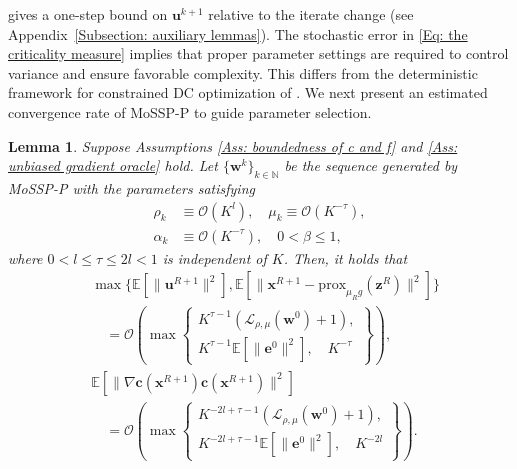 \documentclass{article}
\theoremstyle{plain}
\newtheorem{lemma}{Lemma}[section]
\theoremstyle{definition}
\theoremstyle{remark}
\newcommand{\EE}{\mathbb{E}}
\newcommand{\NN}{\mathbb{N}}
\newcommand{\prox}{\mathrm{prox}}
\newcommand{\bx}{\bm{x}}
\newcommand{\bc}{\bm{c}}
\newcommand{\be}{\bm{e}}
\newcommand{\bu}{\bm{u}}
\newcommand{\bz}{\bm{z}}
\newcommand{\calL}{\mathcal{L}}
\newcommand{\calO}{\mathcal{O}}
\newcommand{\bw}{\bm{w}}
\numberwithin{equation}{section}
\begin{document}
 gives a one-step bound on $\bu^{k+1}$ relative to the iterate change (see Appendix~\ref{Subsection: auxiliary lemmas}). The stochastic error in \eqref{Eq: the criticality measure} implies that proper parameter settings are required to control variance and ensure favorable complexity. This differs from the deterministic framework for constrained DC optimization of \citet{sun2023algorithms}. We next present an estimated convergence rate of MoSSP-P to guide parameter selection.
\begin{lemma}
    \label{Lemma: the estimation of the convergence rate of Polyak for infeasible stationary point} 
    Suppose Assumptions \ref{Ass: boundedness of c and f} and \ref{Ass: unbiased gradient oracle} hold. Let $\{\bw^{k}\}_{k \in \NN}$ be the sequence generated by MoSSP-P
    with the parameters satisfying
\begin{equation}
    \label{Eq: the parameter conditions for Polyak in main body}
\begin{aligned}
\rho_{k} &\equiv \calO( K^{l}), \quad
\mu_{k}\equiv  \calO(K^{{-\tau}}), \\
\alpha_{k} &\equiv  \calO(K^{{-\tau}}), \quad
0 < \beta \leq 1,
\end{aligned}
\end{equation}
where $0 < l \leq \tau \leq 2 l < 1$ is independent of $K$.
Then, it holds that
{\small
\begin{equation}
    \label{Eq: convergence rate of polyak}
\begin{aligned}
&\max\{ \EE [\| \bu^{R+1}\|^{2}],
\EE[\| \bx^{R+1}- \prox_{\mu_R g}(\bz^{R})\|^{2}]\} \\
&\quad = \calO\!\left(
\max\left\{
\begin{gathered}
K^{\tau -1}\left( \calL_{\rho, \mu}(\bw^{0})+1\right),\\
K^{\tau - 1}\EE [\| \be^{0}\|^{2}],\quad
K^{-\tau}
\end{gathered}
\right\}
\right), \\
&\EE [\|\nabla \bc(\bx^{R+1})\bc(\bx^{R+1})\|^{2}] \\
&\quad = \calO\!\left(
\max\left\{
\begin{gathered}
K^{-2l + \tau -1}\left( \calL_{\rho, \mu}(\bw^{0}) + 1 \right),\\
K^{-2l + \tau -1 }\EE [\| \be^{0}\|^{2}],\quad
K^{-2l}
\end{gathered}
\right\}
\right).
\end{aligned}
\end{equation}}
\end{lemma}
\end{document}
